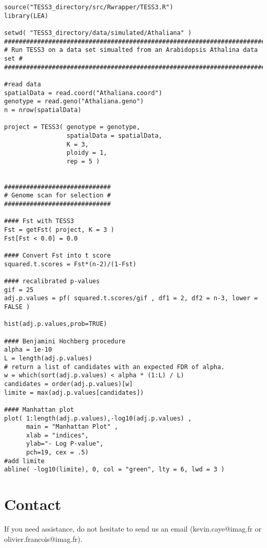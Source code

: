 \documentclass[10pt,a4paper]{article}
\begin{document}
\begin{Verbatim}[frame=single]
source("TESS3_directory/src/Rwrapper/TESS3.R")
library(LEA)

setwd( "TESS3_directory/data/simulated/Athaliana" )
###########################################################################
# Run TESS3 on a data set simualted from an Arabidopsis Athalina data set #
###########################################################################

#read data
spatialData = read.coord("Athaliana.coord")
genotype = read.geno("Athaliana.geno")
n = nrow(spatialData)

project = TESS3( genotype = genotype, 
                 spatialData = spatialData, 
                 K = 3, 
                 ploidy = 1, 
                 rep = 5 )


#############################
# Genome scan for selection #
#############################

#### Fst with TESS3 
Fst = getFst( project, K = 3 )
Fst[Fst < 0.0] = 0.0

#### Convert Fst into t score
squared.t.scores = Fst*(n-2)/(1-Fst)

#### recalibrated p-values
gif = 25
adj.p.values = pf( squared.t.scores/gif , df1 = 2, df2 = n-3, lower = FALSE )

hist(adj.p.values,prob=TRUE)

#### Benjamini Hochberg procedure
alpha = 1e-10
L = length(adj.p.values)
# return a list of candidates with an expected FDR of alpha.
w = which(sort(adj.p.values) < alpha * (1:L) / L)
candidates = order(adj.p.values)[w]
limite = max(adj.p.values[candidates])

#### Manhattan plot 
plot( 1:length(adj.p.values),-log10(adj.p.values) , 
      main = "Manhattan Plot" , 
      xlab = "indices", 
      ylab="- Log P-value", 
      pch=19, cex = .5) 
#add limite
abline( -log10(limite), 0, col = "green", lty = 6, lwd = 3 )
\end{Verbatim}

\section{Contact}
If you need assistance, do not hesitate to send us an email (kevin.caye@imag.fr or olivier.francois@imag.fr). 



\end{document}
